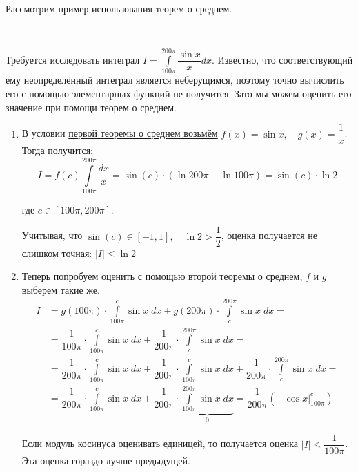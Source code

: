 \documentclass[../main.tex]{subfiles}
\begin{document}
Рассмотрим пример использования теорем о среднем. 

\begin{example}
    
    ~

    Требуется исследовать интеграл \( I= \displaystyle\int\limits_{ 100 \pi }^{ 200 \pi } \dfrac{ \sin x}{ x} dx\). Известно, что соответствующий ему неопределённый интеграл является неберущимся, поэтому точно вычислить его с помощью элементарных функций не получится. Зато мы можем оценить его значение при помощи теорем о среднем. 

    \begin{enumerate}
        \item В условии \hyperlink{thm:first_average}{первой теоремы о среднем возьмём} \( f\left( x\right)=\sin x,\quad g \left( x\right) = \dfrac{ 1}{ x} \). Тогда получится:
        \[ I=f \left( c\right) \displaystyle\int\limits_{ 100 \pi }^{ 200 \pi } \dfrac{ dx}{ x} =\sin \left( c\right) \cdot \left( \ln 200 \pi - \ln 100 \pi \right)=\sin \left( c\right) \cdot \ln 2\]
        \par где \( c \in \left[ 100 \pi , 200 \pi \right]\). 
        \par Учитывая, что \( \sin \left( c\right) \in \left[ -1, 1\right],\quad \ln 2 > \dfrac{ 1}{ 2} \), оценка получается не слишком точная: \( \left| I\right| \leq \ln 2\)
        \item Теперь попробуем оценить с помощью второй теоремы о среднем, \( f\) и \( g\) выберем такие же. 
        \begin{equation*}
            \begin{aligned}
                I&=g \left( 100 \pi \right) \cdot \displaystyle\int\limits_{ 100 \pi }^{ c} \sin x\; dx + g \left( 200 \pi \right) \cdot  \displaystyle\int\limits_{ c}^{ 200 \pi } \sin x\;dx=\\ 
                &= \dfrac{ 1}{ 100 \pi } \cdot \displaystyle\int\limits_{ 100 \pi }^{ c} \sin x \; dx + \dfrac{ 1}{ 200 \pi } \cdot \displaystyle\int\limits_{ c}^{ 200 \pi } \sin x\;dx=\\
                &= \dfrac{ 1}{ 200 \pi } \cdot \displaystyle\int\limits_{ 100 \pi }^{ c} \sin x\; dx + \dfrac{ 1}{ 200 \pi } \cdot  \displaystyle\int\limits_{ 100 \pi }^{ c} \sin x\;dx + \dfrac{ 1}{ 200 \pi } \cdot \displaystyle\int\limits_{ c}^{ 200 \pi } \sin x\;dx=\\
                &= \dfrac{ 1}{ 200 \pi } \cdot \displaystyle\int\limits_{ 100 \pi }^{ c} \sin x\; dx + \dfrac{ 1}{ 200 \pi } \cdot \underbrace{\displaystyle\int\limits_{ 100 \pi }^{ 200 \pi } \sin x\; dx}_0= \dfrac{ 1}{ 200 \pi} \left( - \cos x\bigg|_{100\pi}^c\right)  
            \end{aligned}
        \end{equation*}
        \par Если модуль косинуса оценивать единицей, то получается оценка \( \left| I\right| \leq \dfrac{ 1}{ 100 \pi } \). Эта оценка гораздо лучше предыдущей. 
    \end{enumerate}
\end{example}
\end{document}
